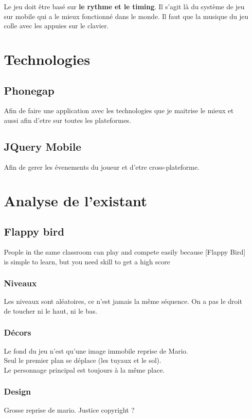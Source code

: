 \documentclass{article}
\begin{document}
Le jeu doit être basé sur \textbf{le rythme et le timing}. Il s'agit là du système de jeu sur mobile qui a le mieux fonctionné dans le monde. Il faut que la musique du jeu colle avec les appuies sur le clavier.\\
\section{Technologies}
\subsection{Phonegap}
Afin de faire une application avec les technologies que je maitrise le mieux et aussi afin d'etre sur toutes les plateformes.
\subsection{JQuery Mobile}
Afin de gerer les évenements du joueur et d'etre cross-plateforme.
\section{Analyse de l'existant}
\subsection{Flappy bird}
People in the same classroom can play and compete easily because [Flappy Bird] is simple to learn, but you need skill to get a high score

\subsubsection{Niveaux}
Les niveaux sont aléatoires, ce n'est jamais la même séquence. On a pas le droit de toucher ni le haut, ni le bas.

\subsubsection{Décors}
Le fond du jeu n'est qu'une image immobile reprise de Mario.\\
Seul le premier plan se déplace (les tuyaux et le sol).\\
Le personnage principal est toujours à la même place.

\subsubsection{Design}
Grosse reprise de mario. Justice copyright ?
\end{document}
